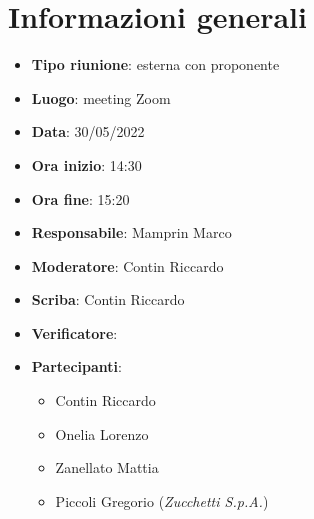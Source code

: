 \section{Informazioni generali}
\begin{itemize}
  \item \textbf{Tipo riunione}: esterna con proponente
  \item \textbf{Luogo}: meeting Zoom
  \item \textbf{Data}: 30/05/2022
  \item \textbf{Ora inizio}: 14:30
  \item \textbf{Ora fine}: 15:20
  \item \textbf{Responsabile}: Mamprin Marco
  \item \textbf{Moderatore}: Contin Riccardo
  \item \textbf{Scriba}: Contin Riccardo
  \item \textbf{Verificatore}: 
  \item \textbf{Partecipanti}:
  \begin{itemize}
    \item Contin Riccardo
    \item Onelia Lorenzo
    \item Zanellato Mattia
    \item Piccoli Gregorio (\textit{Zucchetti S.p.A.})
  \end{itemize}
\end{itemize}
